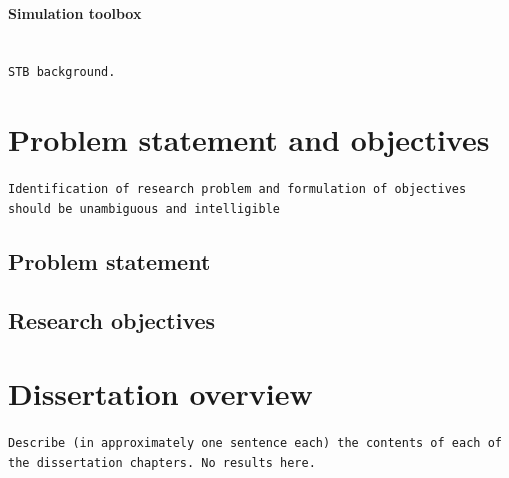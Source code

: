\paragraph{Simulation toolbox}\leavevmode\\
\texttt{STB background.}
\section{Problem statement and objectives}
\texttt{Identification of research problem and formulation of objectives should be unambiguous and intelligible}
\subsection{Problem statement}
\subsection{Research objectives}

\section{Dissertation overview}
\texttt{Describe (in approximately one sentence each) the contents of each of the dissertation chapters. No results here.}
